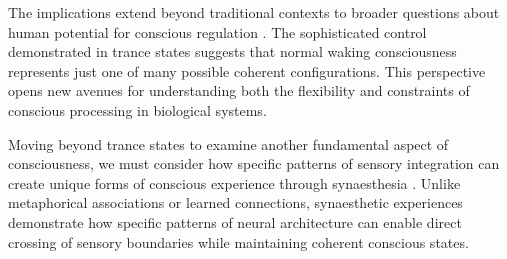 The implications extend beyond traditional contexts to broader questions about human potential for conscious regulation \cite{Lewis2003}. The sophisticated control demonstrated in trance states suggests that normal waking consciousness represents just one of many possible coherent configurations. This perspective opens new avenues for understanding both the flexibility and constraints of conscious processing in biological systems.

Moving beyond trance states to examine another fundamental aspect of consciousness, we must consider how specific patterns of sensory integration can create unique forms of conscious experience through synaesthesia \cite{Goodman1988}. Unlike metaphorical associations or learned connections, synaesthetic experiences demonstrate how specific patterns of neural architecture can enable direct crossing of sensory boundaries while maintaining coherent conscious states.